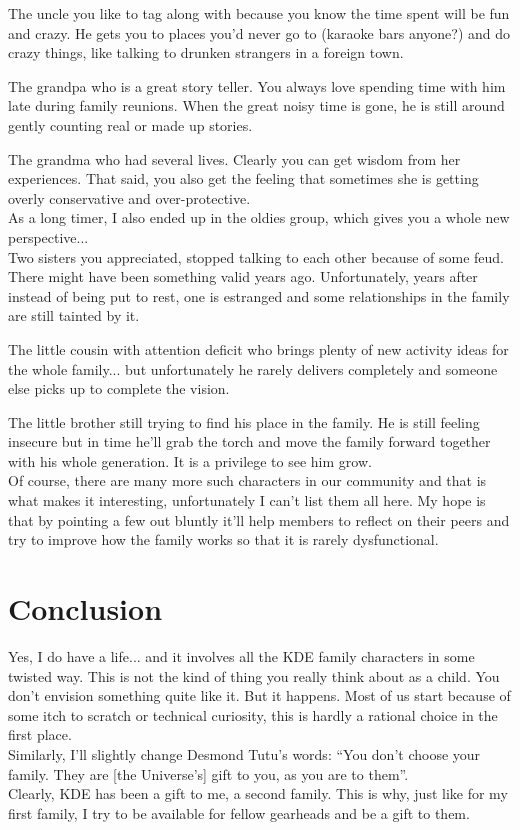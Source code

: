 The uncle you like to tag along with because you know the time spent will be
fun and crazy. He gets you to places you'd never go to (karaoke bars anyone?)
and do crazy things, like talking to drunken strangers in a foreign town.

The grandpa who is a great story teller. You always love spending time with him
late during family reunions. When the great noisy time is gone, he is still
around gently counting real or made up stories.

The grandma who had several lives. Clearly you can get wisdom from her
experiences. That said, you also get the feeling that sometimes she is getting
overly conservative and over-protective. \\

As a long timer, I also ended up in the oldies group, which gives you a whole
new perspective... \\

Two sisters you appreciated, stopped talking to each other because of some feud.
There might have been something valid years ago. Unfortunately, years after
instead of being put to rest, one is estranged and some relationships in the
family are still tainted by it.

The little cousin with attention deficit who brings plenty of new activity
ideas for the whole family... but unfortunately he rarely delivers completely
and someone else picks up to complete the vision.

The little brother still trying to find his place in the family. He is still
feeling insecure but in time he'll grab the torch and move the family forward
together with his whole generation. It is a privilege to see him grow. \\

Of course, there are many more such characters in our community and that is what
makes it interesting, unfortunately I can't list them all here. My hope is that
by pointing a few out bluntly it'll help members to reflect on their peers and
try to improve how the family works so that it is rarely dysfunctional.

\section*{Conclusion}
Yes, I do have a life... and it involves all the KDE family characters in some
twisted way. This is not the kind of thing you really think about as a child. You
don't envision something quite like it. But it happens. Most of us start because
of some itch to scratch or technical curiosity, this is hardly a rational choice
in the first place. \\

Similarly, I'll slightly change Desmond Tutu's words: ``You don’t choose your
family. They are [the Universe's] gift to you, as you are to them''. \\

Clearly, KDE has been a gift to me, a second family. This is why, just like for
my first family, I try to be available for fellow gearheads and be a gift to
them.

